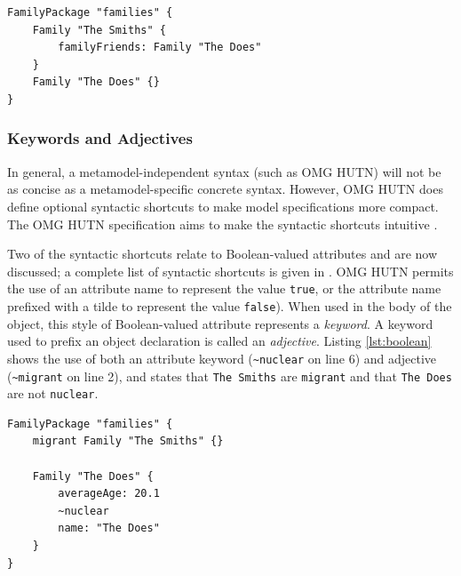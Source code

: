 \begin{lstlisting}[caption={[Specifying a simple reference with HUTN]Specifying a simple reference with HUTN, taken from \cite{rose08hutn}}, label=lst:non-contained, language=HutnFamilies]
FamilyPackage "families" {
    Family "The Smiths" {
        familyFriends: Family "The Does"
    }
    Family "The Does" {}
}
\end{lstlisting}


\subsubsection{Keywords and Adjectives}
In general, a metamodel-independent syntax (such as OMG HUTN) will not be as concise as a metamodel-specific concrete syntax. However, OMG HUTN does define optional syntactic shortcuts to make model specifications more compact. The OMG HUTN specification aims to make the syntactic shortcuts intuitive \cite[pg2-4]{hutn}.

Two of the syntactic shortcuts relate to Boolean-valued attributes and are now discussed; a complete list of syntactic shortcuts is given in \cite{hutn}. OMG HUTN permits the use of an attribute name to represent the value \texttt{true}, or the attribute name prefixed with a tilde to represent the value \texttt{false}). When used in the body of the object, this style of Boolean-valued attribute represents a \emph{keyword}. A keyword used to prefix an object declaration is called an \emph{adjective}. Listing \ref{lst:boolean} shows the use of both an attribute keyword (\texttt{\textasciitilde nuclear} on line 6) and adjective (\texttt{\textasciitilde migrant} on line 2), and states that \texttt{The Sm\-it\-hs} are \texttt{mi\-gr\-a\-nt} and that \texttt{The Do\-es} are not \texttt{nu\-cl\-e\-ar}.

\begin{lstlisting}[caption={[Using keywords and adjectives in HUTN]Using keywords and adjectives in HUTN, taken from \cite{rose08hutn}}, label=lst:boolean, language=HutnFamilies]
FamilyPackage "families" {
    migrant Family "The Smiths" {}

    Family "The Does" {
        averageAge: 20.1
        ~nuclear
        name: "The Does"
    }
}
\end{lstlisting}


